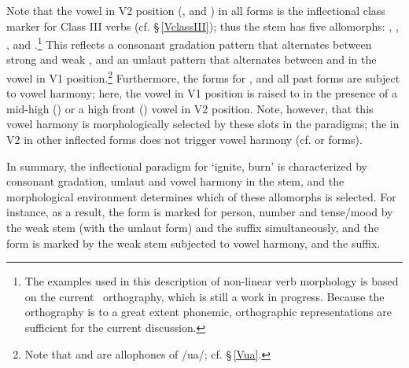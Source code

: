 Note that the vowel in V2 position (,  and ) in all forms is the inflectional class marker for Class III verbs (cf. §\,\ref{VclassIII}); thus the stem has five allomorphs: , , \mbox{,}  and .\footnote{The examples used in this description of non-linear verb morphology is based on the current \PS\ orthography, which is still a work in progress. Because the orthography is to a great extent phonemic, orthographic representations are sufficient for the current discussion.} 
This reflects a consonant gradation pattern that alternates between strong  and weak , and an umlaut pattern that alternates between  and  in the vowel in V1 position.\footnote{Note that  and  are allophones of /ua/; cf. §\,\ref{Vua}.} 
Furthermore, the forms for ,  and all past forms are subject to vowel harmony; here, the vowel in V1 position is raised to  in the presence of a mid-high () or a high front () vowel in V2 position. Note, however, that this vowel harmony is morphologically selected by these slots in the paradigms; the  in V2 in other inflected forms does not trigger vowel harmony (cf.  or  forms). 


In summary, the inflectional paradigm for  ‘ignite, burn’ is characterized by consonant gradation, umlaut and vowel harmony in the stem, and the morphological environment determines which of these allomorphs is selected. %
For instance, as a result, the  form  is marked for person, number and tense/mood by the weak  stem (with the  umlaut form) and the  suffix simultaneously, and the  form  is marked by the weak  stem subjected to vowel harmony, and the  suffix. 

